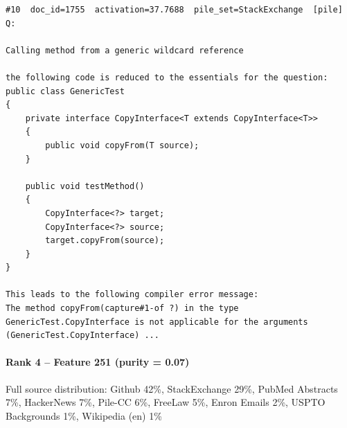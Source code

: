 \begin{verbatim}
#10  doc_id=1755  activation=37.7688  pile_set=StackExchange  [pile]
Q:

Calling method from a generic wildcard reference

the following code is reduced to the essentials for the question:
public class GenericTest 
{
    private interface CopyInterface<T extends CopyInterface<T>>
    {
        public void copyFrom(T source);
    }

    public void testMethod()
    {
        CopyInterface<?> target;
        CopyInterface<?> source;
        target.copyFrom(source);
    }
}

This leads to the following compiler error message:
The method copyFrom(capture#1-of ?) in the type GenericTest.CopyInterface is not applicable for the arguments (GenericTest.CopyInterface) ...

\end{verbatim}

\paragraph*{Rank 4 -- Feature 251 (purity = 0.07)}

Full source distribution: Github 42\%, StackExchange 29\%, PubMed Abstracts 7\%, HackerNews 7\%, Pile-CC 6\%, FreeLaw 5\%, Enron Emails 2\%, USPTO Backgrounds 1\%, Wikipedia (en) 1\%

